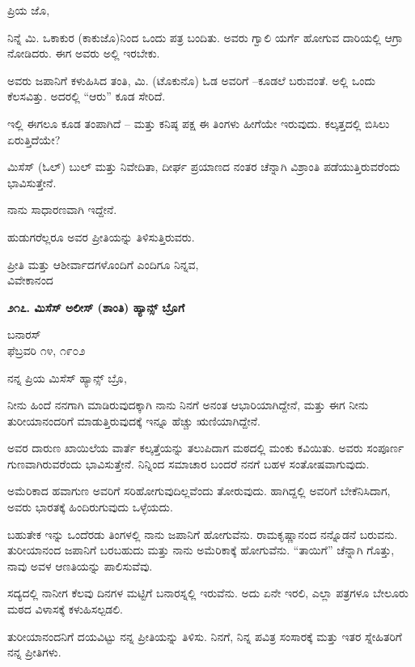 ಪ್ರಿಯ ಜೊ,

ನಿನ್ನೆ ಮಿ. ಒಕಾಕುರ (ಕಾಕುಜೊ)ನಿಂದ ಒಂದು ಪತ್ರ ಬಂದಿತು. ಅವರು ಗ್ವಾಲಿ ಯರ್ಗೆ ಹೋಗುವ ದಾರಿಯಲ್ಲಿ ಆಗ್ರಾ ನೋಡಿದರು. ಈಗ ಅವರು ಅಲ್ಲಿ ಇರಬೇಕು.

ಅವರು ಜಪಾನಿಗೆ ಕಳುಹಿಸಿದ ತಂತಿ, ಮಿ. (ಟೊಕುನೊ) ಓಡ ಅವರಿಗೆ –ಕೂಡಲೆ ಬರುವಂತೆ. ಅಲ್ಲಿ ಒಂದು ಕೆಲಸವಿತ್ತು. ಅದರಲ್ಲಿ “ಆರು” ಕೂಡ ಸೇರಿದೆ.

ಇಲ್ಲಿ ಈಗಲೂ ಕೂಡ ತಂಪಾಗಿದೆ – ಮತ್ತು ಕನಿಷ್ಠ ಪಕ್ಷ ಈ ತಿಂಗಳು ಹೀಗೆಯೇ ಇರುವುದು. ಕಲ್ಕತ್ತದಲ್ಲಿ ಬಿಸಿಲು ಏರುತ್ತಿದೆಯೇ?

ಮಿಸೆಸ್ (ಓಲ್) ಬುಲ್ ಮತ್ತು ನಿವೇದಿತಾ, ದೀರ್ಘ ಪ್ರಯಾಣದ ನಂತರ ಚೆನ್ನಾಗಿ ವಿಶ್ರಾಂತಿ ಪಡೆಯುತ್ತಿರುವರೆಂದು ಭಾವಿಸುತ್ತೇನೆ.

ನಾನು ಸಾಧಾರಣವಾಗಿ ಇದ್ದೇನೆ.

ಹುಡುಗರೆಲ್ಲರೂ ಅವರ ಪ್ರೀತಿಯನ್ನು ತಿಳಿಸುತ್ತಿರುವರು.

\begin{flushright}
ಪ್ರೀತಿ ಮತ್ತು ಆಶೀರ್ವಾದಗಳೊಂದಿಗೆ ಎಂದಿಗೂ ನಿನ್ನವ,\\ವಿವೇಕಾನಂದ
\end{flushright}

\begin{center}
\textbf{೨೧೭. ಮಿಸೆಸ್ ಅಲೀಸ್ (ಶಾಂತಿ) ಹ್ಯಾನ್ಸ್ ಬ್ರೊಗೆ}
\end{center}

\begin{flushright}
ಬನಾರಸ್\\ಫೆಬ್ರವರಿ ೧೪, ೧೯೦೨
\end{flushright}

ನನ್ನ ಪ್ರಿಯ ಮಿಸೆಸ್ ಹ್ಯಾನ್ಸ್ ಬ್ರೊ,

ನೀನು ಹಿಂದೆ ನನಗಾಗಿ ಮಾಡಿರುವುದಕ್ಕಾಗಿ ನಾನು ನಿನಗೆ ಅನಂತ ಆಭಾರಿಯಾಗಿದ್ದೇನೆ, ಮತ್ತು ಈಗ ನೀನು ತುರೀಯಾನಂದರಿಗೆ ಮಾಡುತ್ತಿರುವುದಕ್ಕೆ ಇನ್ನೂ ಹೆಚ್ಚು ಋಣಿಯಾಗಿದ್ದೇನೆ.

ಅವರ ದಾರುಣ ಖಾಯಿಲೆಯ ವಾರ್ತೆ ಕಲ್ಕತ್ತೆಯನ್ನು ತಲುಪಿದಾಗ ಮಠದಲ್ಲಿ ಮಂಕು ಕವಿಯಿತು. ಅವರು ಸಂಪೂರ್ಣ ಗುಣವಾಗಿರುವರೆಂದು ಭಾವಿಸುತ್ತೇನೆ. ನಿನ್ನಿಂದ ಸಮಾಚಾರ ಬಂದರೆ ನನಗೆ ಬಹಳ ಸಂತೋಷವಾಗುವುದು.

ಅಮೆರಿಕಾದ ಹವಾಗುಣ ಅವರಿಗೆ ಸರಿಹೋಗುವುದಿಲ್ಲವೆಂದು ತೋರುವುದು. ಹಾಗಿದ್ದಲ್ಲಿ ಅವರಿಗೆ ಬೇಕೆನಿಸಿದಾಗ, ಅವರು ಭಾರತಕ್ಕೆ ಹಿಂದಿರುಗುವುದು ಒಳ್ಳೆಯದು.

ಬಹುತೇಕ ಇನ್ನು ಒಂದೆರಡು ತಿಂಗಳಲ್ಲಿ ನಾನು ಜಪಾನಿಗೆ ಹೋಗುವೆನು. ರಾಮಕೃಷ್ಣಾನಂದ ನನ್ನೊಡನೆ ಬರುವನು. ತುರೀಯಾನಂದ ಜಪಾನಿಗೆ ಬರಬಹುದು ಮತ್ತು ನಾನು ಅಮೆರಿಕಾಕ್ಕೆ ಹೋಗುವೆನು. “ತಾಯಿಗೆ” ಚೆನ್ನಾಗಿ ಗೊತ್ತು, ನಾವು ಅವಳ ಆಣತಿಯನ್ನು ಪಾಲಿಸುವೆವು.

ಸದ್ಯದಲ್ಲಿ ನಾನೀಗ ಕೆಲವು ದಿನಗಳ ಮಟ್ಟಿಗೆ ಬನಾರಸ್ನಲ್ಲಿ ಇರುವೆನು. ಅದು ಏನೇ ಇರಲಿ, ಎಲ್ಲಾ ಪತ್ರಗಳೂ ಬೇಲೂರು ಮಠದ ವಿಳಾಸಕ್ಕೆ ಕಳುಹಿಸಲ್ಪಡಲಿ.

ತುರೀಯಾನಂದನಿಗೆ ದಯವಿಟ್ಟು ನನ್ನ ಪ್ರೀತಿಯನ್ನು ತಿಳಿಸು. ನಿನಗೆ, ನಿನ್ನ ಪವಿತ್ರ ಸಂಸಾರಕ್ಕೆ ಮತ್ತು ಇತರ ಸ್ನೇಹಿತರಿಗೆ ನನ್ನ ಪ್ರೀತಿಗಳು.

